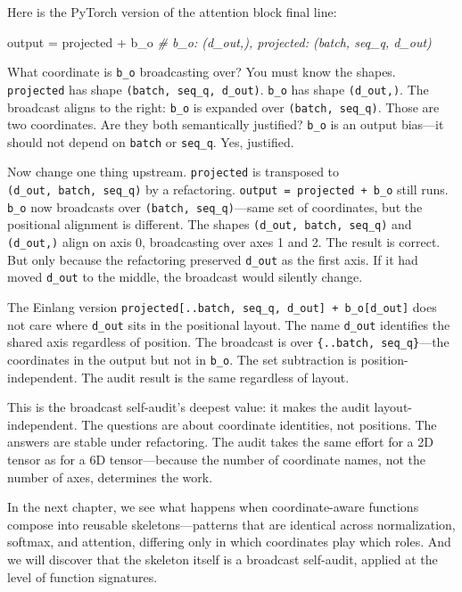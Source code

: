 \documentclass[11pt,titlepage]{article}
\newenvironment{Shaded}{}{}
\newcommand{\CommentTok}[1]{\textcolor[rgb]{0.38,0.63,0.69}{\textit{#1}}}
\newcommand{\NormalTok}[1]{#1}
\newcommand{\OperatorTok}[1]{\textcolor[rgb]{0.40,0.40,0.40}{#1}}
\begin{document}
Here is the PyTorch version of the attention block final line:

\begin{Shaded}
\begin{Highlighting}[]
\NormalTok{output }\OperatorTok{=}\NormalTok{ projected }\OperatorTok{+}\NormalTok{ b_o  }\CommentTok{# b_o: (d_out,), projected: (batch, seq_q, d_out)}
\end{Highlighting}
\end{Shaded}

What coordinate is \texttt{b\_o} broadcasting over? You must know the
shapes. \texttt{projected} has shape \texttt{(batch,\ seq\_q,\ d\_out)}.
\texttt{b\_o} has shape \texttt{(d\_out,)}. The broadcast aligns to the
right: \texttt{b\_o} is expanded over \texttt{(batch,\ seq\_q)}. Those
are two coordinates. Are they both semantically justified? \texttt{b\_o}
is an output bias---it should not depend on \texttt{batch} or
\texttt{seq\_q}. Yes, justified.

Now change one thing upstream. \texttt{projected} is transposed to
\texttt{(d\_out,\ batch,\ seq\_q)} by a refactoring.
\texttt{output\ =\ projected\ +\ b\_o} still runs. \texttt{b\_o} now
broadcasts over \texttt{(batch,\ seq\_q)}---same set of coordinates, but
the positional alignment is different. The shapes
\texttt{(d\_out,\ batch,\ seq\_q)} and \texttt{(d\_out,)} align on axis
0, broadcasting over axes 1 and 2. The result is correct. But only
because the refactoring preserved \texttt{d\_out} as the first axis. If
it had moved \texttt{d\_out} to the middle, the broadcast would silently
change.

The Einlang version
\texttt{projected{[}..batch,\ seq\_q,\ d\_out{]}\ +\ b\_o{[}d\_out{]}}
does not care where \texttt{d\_out} sits in the positional layout. The
name \texttt{d\_out} identifies the shared axis regardless of position.
The broadcast is over \texttt{\{..batch,\ seq\_q\}}---the coordinates in
the output but not in \texttt{b\_o}. The set subtraction is
position-independent. The audit result is the same regardless of layout.

This is the broadcast self-audit's deepest value: it makes the audit
layout-independent. The questions are about coordinate identities, not
positions. The answers are stable under refactoring. The audit takes the
same effort for a 2D tensor as for a 6D tensor---because the number of
coordinate names, not the number of axes, determines the work.

In the next chapter, we see what happens when coordinate-aware functions
compose into reusable skeletons---patterns that are identical across
normalization, softmax, and attention, differing only in which
coordinates play which roles. And we will discover that the skeleton
itself is a broadcast self-audit, applied at the level of function
signatures.
\end{document}
